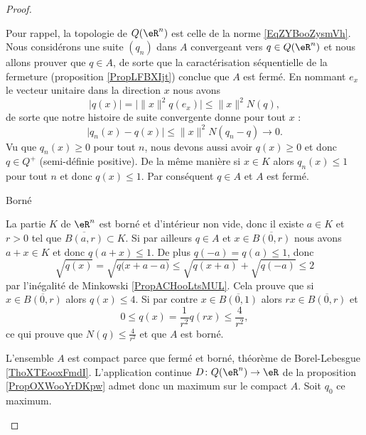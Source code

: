 \begin{proof}
\begin{subproof}
\begin{subproof}
            Pour rappel, la topologie de \( Q(\eR^n)\) est celle de la norme \eqref{EqZYBooZysmVh}. Nous considérons une suite \( (q_n)\) dans \( A\) convergeant vers \( q\in Q(\eR^n)\) et nous allons prouver que \( q\in A\), de sorte que la caractérisation séquentielle de la fermeture (proposition \ref{PropLFBXIjt}) conclue que \( A\) est fermé. En nommant \( e_x\) le vecteur unitaire dans la direction \( x\) nous avons
            \begin{equation}
                \big| q(x) \big|=\big| \| x \|^2q(e_x) \big|\leq \| x \|^2N(q),
            \end{equation}
            de sorte que notre histoire de suite convergente  donne pour tout \( x\) :
            \begin{equation}
                \big| q_n(x)-q(x) \big|\leq \| x \|^2N(q_n-q)\to 0.
            \end{equation}
            Vu que \( q_n(x)\geq 0\) pour tout \( n\), nous devons aussi avoir \( q(x)\geq 0\) et donc \( q\in Q^+\) (semi-définie positive). De la même manière si \( x\in K\) alors \( q_n(x)\leq 1\) pour tout \( n\) et donc \( q(x)\leq 1\). Par conséquent \( q\in A\) et \( A\) est fermé.

        \item[Borné]

            La partie \( K\) de \( \eR^n\) est borné et d'intérieur non vide, donc il existe \( a\in K\) et \( r>0\) tel que \( \overline{ B(a,r) }\subset K\). Si par ailleurs \( q\in A\) et \( x\in\overline{ B(0,r) }\) nous avons \( a+x\in K\) et donc \( q(a+x)\leq 1\). De plus \( q(-a)=q(a)\leq 1\), donc
            \begin{equation}
                \sqrt{q(x)}=\sqrt{q\big( x+a-a \big)}\leq \sqrt{q(x+a)}+\sqrt{q(-a)}\leq 2
            \end{equation}
            par l'inégalité de Minkowski \ref{PropACHooLtsMUL}. Cela prouve que si \( x\in\overline{ B(0,r) }\) alors \( q(x)\leq 4\). Si par contre \( x\in\overline{ B(0,1) }\) alors \( rx\in\overline{ B(0,r) } \) et 
            \begin{equation}
                0\leq q(x)=\frac{1}{ r^2 }q(rx)\leq \frac{ 4 }{ r^2 },
            \end{equation}
            ce qui prouve que \( N(q)\leq \frac{ 4 }{ r^2 }\) et que \( A\) est borné.


            \end{subproof}

            L'ensemble \( A\) est compact parce que fermé et borné, théorème de Borel-Lebesgue \ref{ThoXTEooxFmdI}. L'application continue \( D\colon Q(\eR^n)\to \eR\) de la proposition \ref{PropOXWooYrDKpw} admet donc un maximum sur le compact \( A\). Soit \( q_0\) ce maximum.


\end{subproof}
\end{proof}
